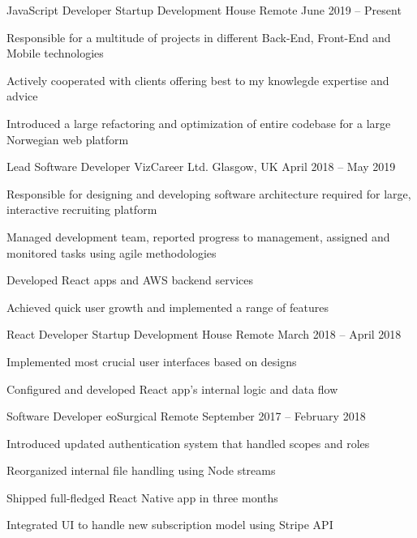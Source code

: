 \documentclass[]{awesome-cv}
\begin{document}
\vspace{-5mm}
\begin{cventries}
  \cventry
  {JavaScript Developer}
  {Startup Development House}
  {Remote}
  {June 2019 – Present}
  {\begin{cvitems}
    \item {Responsible for a multitude of projects in different Back-End, Front-End and Mobile technologies}
    \item {Actively cooperated with clients offering best to my knowlegde expertise and advice}
    \item {Introduced a large refactoring and optimization of entire codebase for a large Norwegian web platform}
    \end{cvitems}}
  \cventry
  {Lead Software Developer}
  {VizCareer Ltd.}
  {Glasgow, UK}
  {April 2018 – May 2019}
  {\begin{cvitems}
    \item {Responsible for designing and developing software architecture required for large, interactive recruiting platform}
    \item {Managed development team, reported progress to management, assigned and monitored tasks using agile methodologies}
    \item {Developed React apps and AWS backend services}
    \item {Achieved quick user growth and implemented a range of features}
    \end{cvitems}}
	\cventry
	{React Developer}
	{Startup Development House}
	{Remote}
	{March 2018 – April 2018}
	{\begin{cvitems}
		\item {Implemented most crucial user interfaces based on designs}
    \item {Configured and developed React app's internal logic and data flow}
		\end{cvitems}}
  \cventry
  {Software Developer}
  {eoSurgical}
  {Remote}
  {September 2017 – February 2018}
  {\begin{cvitems}
    \item {Introduced updated authentication system that handled scopes and roles}
    \item {Reorganized internal file handling using Node streams}
    \item {Shipped full-fledged React Native app in three months}
    \item {Integrated UI to handle new subscription model using Stripe API}

\end{cvitems}}
\end{cventries}
\end{document}
